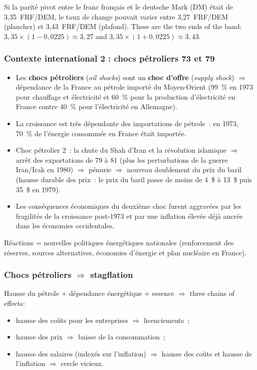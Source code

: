 \begin{example}
  Si la parité pivot entre le franc français et le deutsche Mark (DM) était de
  3,35~FRF/DEM, le taux de change pouvait varier entre 3,27~FRF/DEM (plancher) et
  3,43~FRF/DEM (plafond). These are the two ends of the band: $3{,}35 \times (1 -
  0{,}0225) \approx 3{,}27$ and $3{,}35 \times (1 + 0{,}0225) \approx 3{,}43$.
\end{example}

\subsubsection{Contexte international 2 : chocs pétroliers 73 et 79}

\begin{itemize}
  \item Les \textbf{chocs pétroliers} (\textit{oil shocks}) sont un \textbf{choc d'offre}
    (\textit{supply shock}) $\Rightarrow$ dépendance de la France au pétrole importé du
    Moyen-Orient (99~\% en 1973 pour chauffage et électricité et 60~\% pour la
    production d'électricité en France contre 40~\% pour l'électricité en Allemagne).
  \item La croissance est très dépendante des importations de pétrole~: en 1973, 70~\% de
    l'énergie consommée en France était importée.
  \item Choc pétrolier 2~: la chute du Shah d'Iran et la révolution islamique
    $\Rightarrow$ arrêt des exportations de 79 à 81 (plus les perturbations de la guerre
    Iran/Irak en 1980) $\Rightarrow$ pénurie $\Rightarrow$ nouveau doublement du prix
    du baril (hausse durable des prix~: le prix du baril passe de moins de 4~\$ à 13~\$
    puis 35~\$ en 1979).
  \item Les conséquences économiques du deuxième choc furent aggravées par les
    fragilités de la croissance post-1973 et par une inflation élevée déjà ancrée dans
    les économies occidentales.
\end{itemize}
Réactions = nouvelles politiques énergétiques nationales
(renforcement des réserves, sources alternatives, économies d'énergie et plan nucléaire
en France).

\subsubsection{Chocs pétroliers $\Rightarrow$ stagflation}

Hausse du pétrole + dépendance énergétique + essence $\Rightarrow$ three chains of
effects:
\begin{itemize}
  \item hausse des coûts pour les entreprises $\Rightarrow$ licenciements~;
  \item hausse des prix $\Rightarrow$ baisse de la consommation~;
  \item hausse des salaires (indexés sur l'inflation) $\Rightarrow$ hausse des coûts et
    hausse de l'inflation $\Rightarrow$ cercle vicieux.
\end{itemize}

